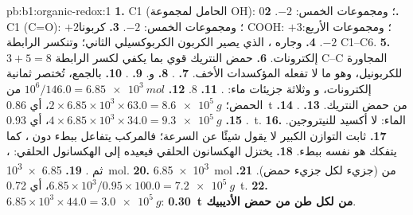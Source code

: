 \begin{solution}{pb:b1:organic-redox:1}
\textbf{1.} C1 (الحامل لمجموعة OH): 0؛ ومجموعات  الخمس: $-2$.
\textbf{2.} C1 (C=O): $+2$؛ ومجموعات  الخمس: $-2$.
\textbf{3.} كربونا COOH: $+3$؛ ومجموعات  الأربع: $-2$.
\textbf{4.}  وجاره ، الذي
يصير الكربون الكربوكسيلي الثاني؛ وتنكسر الرابطة C1--C6.
\textbf{5.} $3 + 5 = 8$ إلكترونات.
\textbf{6.} حمض النتريك قوي بما يكفي لكسر الرابطة C--C المجاورة
للكربونيل، وهو ما لا تفعله المؤكسدات الأخف.
\textbf{7.} .
\textbf{8.}  و.
\textbf{9.} .
\textbf{10.} بالجمع، تُختصر ثمانية إلكترونات، و وثلاثة جزيئات ماء:
.
\textbf{11.} 8.
\textbf{12.} $10^6/146.0 = \qty{6.85e3}{mol}$ من الحمض؛ $2 \times 6.85 \times
10^3 \times 63.0 = \qty{8.6e5}{g}$، أي \qty{0.86}{t} من حمض النتريك.
\textbf{13.} .
\textbf{14.} .
\textbf{15.} $4 \times 6.85 \times 10^3 \times 34.0 = \qty{9.3e5}{g}$،
أي \qty{0.93}{t}.
\textbf{16.} الماء: لا أكسيد للنيتروجين.
\textbf{17.} ثابت التوازن الكبير لا يقول شيئًا عن السرعة؛
فالمركب  يتفاعل ببطء دون ، كما يتفكك هو نفسه ببطء.
\textbf{18.} يختزل الهكسانون الحلقي فيعيده إلى الهكسانول الحلقي:
، ثم
.
\textbf{19.} \qty{6.85e3}{mol}.
\textbf{20.} \qty{6.85e3}{mol} من  (جزيء لكل جزيء حمض).
\textbf{21.} $6.85 \times 10^3/0.95 \times 100.0 = \qty{7.2e5}{g}$، أي \qty{0.72}{t}.
\textbf{22.} $6.85 \times 10^3 \times 44.0 = \qty{3.0e5}{g}$: \textbf{\qty{0.30}{t}
من  لكل طن من حمض الأديبيك}.
\end{solution}
